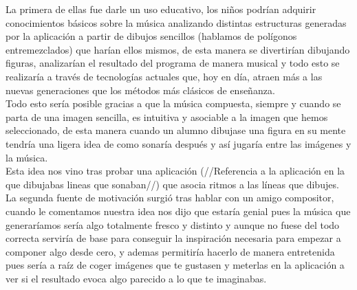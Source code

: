 La primera de ellas fue darle un uso educativo, los niños podrían adquirir conocimientos básicos sobre la música analizando distintas estructuras generadas por la aplicación a partir de dibujos sencillos (hablamos de polígonos entremezclados) que harían ellos mismos, de esta manera se divertirían dibujando figuras, analizarían el resultado del programa de manera musical y todo esto se realizaría a través de tecnologías actuales que,  hoy en día, atraen más a las nuevas generaciones que los métodos más clásicos de enseñanza.
\newline
\\Todo esto sería posible gracias a que la música compuesta, siempre y cuando se parta de una imagen sencilla, es intuitiva y asociable a la imagen que hemos seleccionado, de esta manera cuando un alumno dibujase una figura en su mente tendría una ligera idea de como sonaría después y así jugaría entre las imágenes y la música.
\\Esta idea nos vino tras probar una aplicación (//Referencia a la aplicación en la que dibujabas lineas que sonaban//) que asocia ritmos a las líneas que dibujes.
\newline
\\La segunda fuente de motivación surgió tras hablar con un amigo compositor, cuando le comentamos nuestra idea nos dijo que estaría genial pues la música que generaríamos sería algo totalmente fresco y distinto y aunque no fuese del todo correcta serviría de base para conseguir la inspiración necesaria para empezar a componer algo desde cero, y ademas permitiría hacerlo de manera entretenida pues sería  a raíz de coger imágenes que te gustasen y meterlas en la aplicación a ver si el resultado evoca algo parecido a lo que te imaginabas.
\color{black}